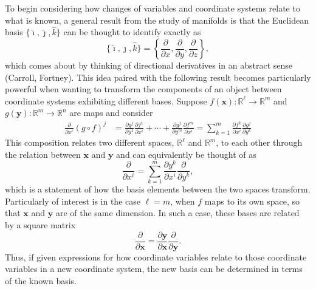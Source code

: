 \documentclass[11pt,dvipsnames]{thesis}
\begin{document}
To begin considering how changes of variables and coordinate systems relate to what is known, a general result from the study of manifolds is that the Euclidean basis $\{\hat{\imath}, \hat{\jmath}, \hat{k}\}$ can be thought to identify exactly as
\begin{equation}
\{\hat{\imath}, \hat{\jmath}, \hat{k}\} = \left\{\frac{\partial}{\partial x}, \frac{\partial}{\partial y}, \frac{\partial}{\partial z}\right\},
\end{equation}
which comes about by thinking of directional derivatives in an abstract sense (Carroll, Fortney). This idea paired with the following result becomes particularly powerful when wanting to transform the components of an object between coordinate systems exhibiting different bases. Suppose $f(\mathbf{x}) : \mathbb{R}^\ell \to \mathbb{R}^m$ and $g(\mathbf{y}) : \mathbb{R}^m \to \mathbb{R}^n$ are maps and consider
\begin{align}
\frac{\partial}{\partial x^i}(g \circ f)^j &= \frac{\partial g^j}{\partial y^1} \frac{\partial f^1}{\partial x^i} + \cdots + \frac{\partial g^j}{\partial y^m} \frac{\partial f^m}{\partial x^i} = \sum_{k =1}^m \frac{\partial f^k}{\partial x^i} \frac{\partial g^j}{\partial y^k}
\end{align}
This composition relates two different spaces, $\mathbb{R}^\ell$ and $\mathbb{R}^m$, to each other through the relation between $\mathbf{x}$ and $\mathbf{y}$ and can equivalently be thought of as
\begin{equation}
\frac{\partial}{\partial x^i} = \sum_{k = 1}^m \frac{\partial y^k}{\partial x^i} \frac{\partial}{\partial y^k},
\end{equation}
which is a statement of how the basis elements between the two spaces transform. Particularly of interest is in the case $\ell = m$, when $f$ maps to its own space, so that $\mathbf{x}$ and $\mathbf{y}$ are of the same dimension. In such a case, these bases are related by a square matrix
\begin{equation}
\frac{\partial}{\partial \mathbf{x}} = \frac{\partial \mathbf{y}}{\partial \mathbf{x}} \frac{\partial}{\partial \mathbf{y}}.
\end{equation}
Thus, if given expressions for how coordinate variables relate to those coordinate variables in a new coordinate system, the new basis can be determined in terms of the known basis.
\end{document}
